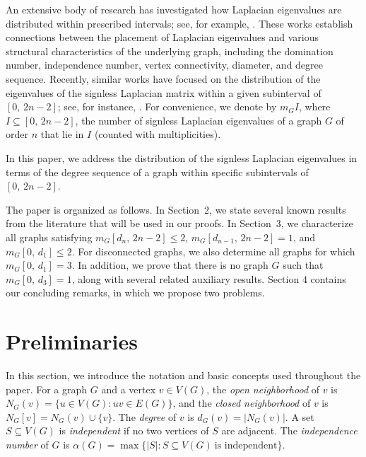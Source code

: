 \documentclass[preprint,12pt]{elsarticle}
\begin{document}
An extensive body of research has investigated how Laplacian eigenvalues are distributed within prescribed intervals; see, for example, \cite{ahanjideh, darougheh1, darougheh2, Cardoso2017, Guo2011, HEDETNIEMI201666, WANG2020307, XU202392}. These works establish connections between the placement of Laplacian eigenvalues and various structural characteristics of the underlying graph, including the domination number, independence number, vertex connectivity, diameter, and degree sequence. Recently, similar works have focused on the distribution of the eigenvalues of the signless Laplacian matrix within a given subinterval of $[0,\, 2n-2]$; see, for instance, \cite{xu2024distribution, ghodrati, belardocircunferencia, Lin2015}. For convenience, we denote by $m_GI$, where $I \subseteq [0,\, 2n-2]$, the number of signless Laplacian eigenvalues of a graph $G$ of order $n$ that lie in $I$ (counted with multiplicities). 

In this paper, we address the distribution of the signless Laplacian eigenvalues in terms of the degree sequence of a graph within specific subintervals of $[0, \, 2n-2].$ 

The paper is organized as follows. In Section~2, we state several known results from the literature that will be used in our proofs. In Section~3, we characterize all graphs satisfying $m_G[d_n,\, 2n-2] \le 2$, $m_G[d_{n-1},\, 2n-2] = 1$, and $m_G[0,\, d_1] \le 2$. For disconnected graphs, we also determine all graphs for which $m_G[0,\, d_1] = 3$. In addition, we prove that there is no graph $G$ such that $m_G[0,\, d_3] = 1$, along with several related auxiliary results. Section 4 contains our concluding remarks, in which we propose two problems.



\section{Preliminaries}

In this section, we introduce the notation and basic concepts used throughout the paper.
For a graph $G$ and a vertex $v \in V(G)$, the \emph{open neighborhood} of $v$ is
$N_G(v) = \{u \in V(G) : uv \in E(G)\}$, and the \emph{closed neighborhood} of $v$ is
$N_G[v] = N_G(v) \cup \{v\}$. The \emph{degree} of $v$ is $d_G(v) = |N_G(v)|$.
A set $S \subseteq V(G)$ is \emph{independent} if no two vertices of $S$ are adjacent.
The \emph{independence number} of $G$ is
$\alpha(G) = \max\{|S| : S \subseteq V(G)\ \text{is independent}\}$.
\end{document}

